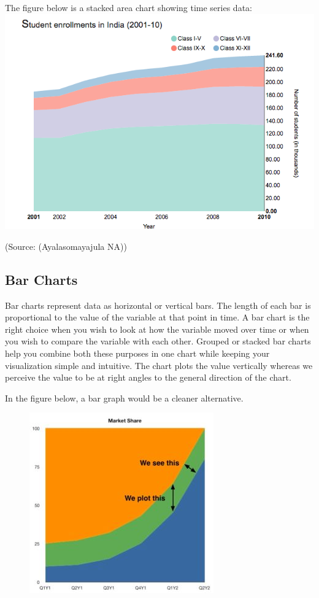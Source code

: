 \documentclass[]{book}
\theoremstyle{definition}
\theoremstyle{definition}
\theoremstyle{definition}
\theoremstyle{remark}
\begin{document}
The figure below is a stacked area chart showing time series data:
\includegraphics{images/aya-stacked.png}

(Source: (Ayalasomayajula NA))

\subsection{Bar Charts}\label{bar-charts}

Bar charts represent data as horizontal or vertical bars. The length of
each bar is proportional to the value of the variable at that point in
time. A bar chart is the right choice when you wish to look at how the
variable moved over time or when you wish to compare the variable with
each other. Grouped or stacked bar charts help you combine both these
purposes in one chart while keeping your visualization simple and
intuitive. The chart plots the value vertically whereas we perceive the
value to be at right angles to the general direction of the chart.

In the figure below, a bar graph would be a cleaner alternative.

\begin{figure}
\centering
\includegraphics{images/aya-stacked-perception.jpg}
\caption{}
\end{figure}
\end{document}
